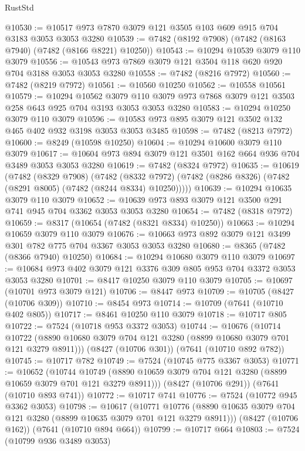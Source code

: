 \begin{lexlean}{RustStd}
\begin{coremodule}
@10530 := @10517 @973 @7870 @3079 @121 @3505 @103 @609 @915 @704 @3183 @3053 @3053 @3280
@10539 := @7482 (@8192 @7908) (@7482 (@8163 @7940) (@7482 (@8166 @8221) @10250))
@10543 := @10294 @10539 @3079 @110 @3079
@10556 := @10543 @973 @7869 @3079 @121 @3504 @118 @620 @920 @704 @3188 @3053 @3053 @3280
@10558 := @7482 (@8216 @7972)
@10560 := @7482 (@8219 @7972)
@10561 := @10560 @10250
@10562 := @10558 @10561
@10579 := @10294
    @10562
    @3079
    @110
    @3079
    @973
    @7868
    @3079
    @121
    @3503
    @258
    @643
    @925
    @704
    @3193
    @3053
    @3053
    @3280
@10583 := @10294 @10250 @3079 @110 @3079
@10596 := @10583 @973 @895 @3079 @121 @3502 @132 @465 @402 @932 @3198 @3053 @3053 @3485
@10598 := @7482 (@8213 @7972)
@10600 := @8249 (@10598 @10250)
@10604 := @10294 @10600 @3079 @110 @3079
@10617 := @10604 @973 @894 @3079 @121 @3501 @162 @664 @936 @704 @3489 @3053 @3053 @3280
@10619 := @7482 (@8324 @7972)
@10635 := @10619
    (@7482
      (@8329 @7908)
      (@7482
        (@8332 @7972)
        (@7482 (@8286 @8326) (@7482 (@8291 @8005) (@7482 (@8244 @8334) @10250)))))
@10639 := @10294 @10635 @3079 @110 @3079
@10652 := @10639 @973 @893 @3079 @121 @3500 @291 @741 @945 @704 @3362 @3053 @3053 @3280
@10654 := @7482 (@8318 @7972)
@10659 := @8317 (@10654 (@7482 (@8321 @8334) @10250))
@10663 := @10294 @10659 @3079 @110 @3079
@10676 := @10663 @973 @892 @3079 @121 @3499 @301 @782 @775 @704 @3367 @3053 @3053 @3280
@10680 := @8365 (@7482 (@8366 @7940) @10250)
@10684 := @10294 @10680 @3079 @110 @3079
@10697 := @10684 @973 @402 @3079 @121 @3376 @309 @805 @953 @704 @3372 @3053 @3053 @3280
@10701 := @8417 @10250 @3079 @110 @3079
@10705 := @10697 (@10701 @973 @3079 @121)
@10706 := @8447 @973
@10709 := @10705 (@8427 (@10706 @309))
@10710 := @8454 @973
@10714 := @10709 (@7641 (@10710 @402 @805))
@10717 := @8461 @10250 @110 @3079
@10718 := @10717 @805
@10722 := @7524 (@10718 @953 @3372 @3053)
@10744 := @10676
    (@10714 @10722 (@8890 @10680 @3079 @704 @121 @3280 (@8899 @10680 @3079 @701 @121 @3279 @8911)))
    (@8427 (@10706 @301))
    (@7641 (@10710 @892 @782))
@10745 := @10717 @782
@10749 := @7524 (@10745 @775 @3367 @3053)
@10771 := @10652
    (@10744 @10749 (@8890 @10659 @3079 @704 @121 @3280 (@8899 @10659 @3079 @701 @121 @3279 @8911)))
    (@8427 (@10706 @291))
    (@7641 (@10710 @893 @741))
@10772 := @10717 @741
@10776 := @7524 (@10772 @945 @3362 @3053)
@10798 := @10617
    (@10771 @10776 (@8890 @10635 @3079 @704 @121 @3280 (@8899 @10635 @3079 @701 @121 @3279 @8911)))
    (@8427 (@10706 @162))
    (@7641 (@10710 @894 @664))
@10799 := @10717 @664
@10803 := @7524 (@10799 @936 @3489 @3053)

\end{coremodule}
\end{lexlean}
